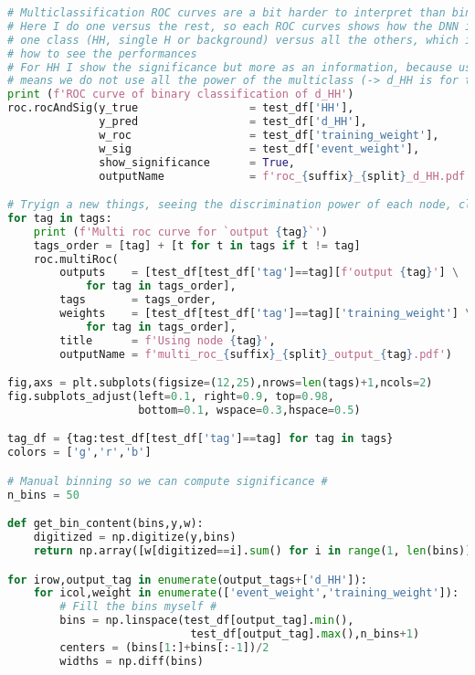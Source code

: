 \begin{lstlisting}[language=Python, caption=DNN setup for the \wwgg semi-leptonic final state, label={dnncode}]
# Multiclassification ROC curves are a bit harder to interpret than binary classification
# Here I do one versus the rest, so each ROC curves shows how the DNN is able to classify
# one class (HH, single H or background) versus all the others, which is one projection on
# how to see the performances
# For HH I show the significance but more as an information, because using only the HH node 
# means we do not use all the power of the multiclass (-> d_HH is for that)
print (f'ROC curve of binary classification of d_HH')
roc.rocAndSig(y_true                 = test_df['HH'],
              y_pred                 = test_df['d_HH'],
              w_roc                  = test_df['training_weight'],
              w_sig                  = test_df['event_weight'],
              show_significance      = True,
              outputName             = f'roc_{suffix}_{split}_d_HH.pdf')

# Tryign a new things, seeing the discrimination power of each node, class wise
for tag in tags:
    print (f'Multi roc curve for `output {tag}`')
    tags_order = [tag] + [t for t in tags if t != tag]
    roc.multiRoc(
        outputs    = [test_df[test_df['tag']==tag][f'output {tag}'] \
            for tag in tags_order],
        tags       = tags_order,
        weights    = [test_df[test_df['tag']==tag]['training_weight'] \
            for tag in tags_order],
        title      = f'Using node {tag}',
        outputName = f'multi_roc_{suffix}_{split}_output_{tag}.pdf')

fig,axs = plt.subplots(figsize=(12,25),nrows=len(tags)+1,ncols=2)
fig.subplots_adjust(left=0.1, right=0.9, top=0.98,
                    bottom=0.1, wspace=0.3,hspace=0.5)

tag_df = {tag:test_df[test_df['tag']==tag] for tag in tags}
colors = ['g','r','b']

# Manual binning so we can compute significance #
n_bins = 50

def get_bin_content(bins,y,w):
    digitized = np.digitize(y,bins)
    return np.array([w[digitized==i].sum() for i in range(1, len(bins))])

for irow,output_tag in enumerate(output_tags+['d_HH']):
    for icol,weight in enumerate(['event_weight','training_weight']):
        # Fill the bins myself #
        bins = np.linspace(test_df[output_tag].min(),
                            test_df[output_tag].max(),n_bins+1)
        centers = (bins[1:]+bins[:-1])/2
        widths = np.diff(bins)
        

\end{lstlisting}
